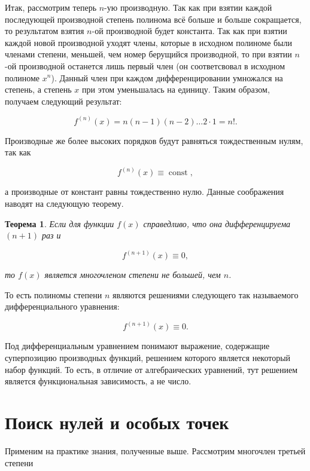 \documentclass[12pt]{article}
\DeclareMathOperator\const{const}
\newtheorem{theorem}{Теорема}[section]
\begin{document}
Итак, рассмотрим теперь $n$\--ую производную. Так как при взятии каждой последующей производной степень полинома всё больше и больше сокращается, то результатом взятия $n$\--ой производной будет константа. Так как при взятии каждой новой производной уходят члены, которые в исходном полиноме были членами степени, меньшей, чем номер берущийся производной, то при взятии $n$\--ой производной останется лишь первый член (он соответсвовал в исходном полиноме $x^n$). Данный член при каждом дифференцировании умножался на степень, а степень $x$ при этом уменьшалась на единицу. Таким образом, получаем следующий результат:

\begin{equation}
	f^{(n)}(x) = n(n-1)(n-2)\ldots2\cdot 1 = n!.
\end{equation}

Производные же более высоких порядков будут равняться тождественным нулям, так как

\begin{equation}
	f^{(n)}(x) \equiv \const,
\end{equation}

а производные от констант равны тождественно нулю. Данные соображения наводят на следующую теорему.

\begin{theorem}
	Если для функции $f(x)$ справедливо, что она дифференцируема $(n+1)$ раз и

	\begin{equation}
		f^{(n+1)}(x) \equiv 0,
	\end{equation}

	то $f(x)$ является многочленом степени не большей, чем $n$.
\end{theorem}

То есть полиномы степени $n$ являются решениями следующего так называемого дифференциального уравнения:

\begin{equation}
		f^{(n+1)}(x) \equiv 0.
\end{equation}

Под дифференциальным уравнением понимают выражение, содержащие суперпозицию производных функций, решением которого является некоторый набор функций. То есть, в отличие от алгебраических уравнений, тут решением является функциональная зависимость, а не число.

\section{Поиск нулей и особых точек}
Применим на практике знания, полученные выше. Рассмотрим многочлен третьей степени
\end{document}

